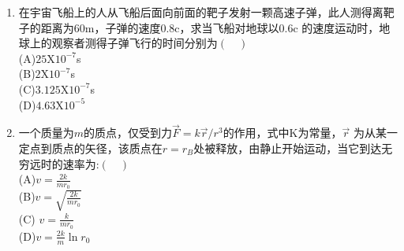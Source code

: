\begin{enumerate}
(A)$0.995c,4.488 MeV,2.66*10^{41}kg.m.s^{-1}$
(B)$0.995c,0.512 MeV,2.66*10^{41}kg.m.s^{-1}$
(C)$0.995c,8.96*10^{-15},2.66*10^{32}kg.m.s^{-1}$
(D)$0.995c,8.96*10^{-15},2.72*10^{28}kg.m.s^{-1}$
\item 在宇宙飞船上的人从飞船后面向前面的靶子发射一颗高速子弹，此人测得离靶子的距离为60m，子弹的速度0.8c，求当飞船对地球以0.6c 的速度运动时，地球上的观察者测得子弹飞行的时间分别为$(\quad)$\\
(A)$25$X$10^{-7}$s\\
(B)$2$X$10^{-7}$s\\
(C)$3.125$X$10^{-7}$s\\
(D)$4.63$X$10^{-5}$
\item 一个质量为$m$的质点，仅受到力$\vec F=k\vec r/r^3$的作用，式中K为常量，$\vec r$ 为从某一定点到质点的矢径，该质点在$r=r_B$处被释放，由静止开始运动，当它到达无穷远时的速率为:$(\quad)$\\
(A)$\displaystyle v=\frac{2k}{mr_0}$\\
(B)$\displaystyle v=\sqrt{\frac{2k}{mr_0}}$\\
(C) $\displaystyle v=\frac{k}{mr_0}$\\
(D)$\displaystyle v=\frac{2k}{m}\ln r_0$


\end{enumerate}
